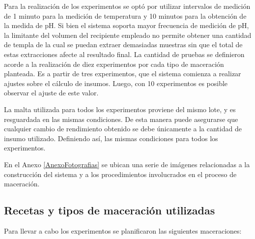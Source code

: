         \par Para la realización de los experimentos se optó por utilizar intervalos de medición de 1 minuto para la medición de temperatura y 10 minutos para la obtención de la medida de pH. Si bien el sistema soporta mayor frecuencia de medición de pH, la limitante del volumen del recipiente empleado no permite obtener una cantidad de templa de la cual se puedan extraer demasiadas muestras sin que el total de estas extracciones afecte al resultado final. La cantidad de pruebas se definieron acorde a la realización de diez experimentos por cada tipo de maceración planteada. Es a partir de tres experimentos, que el sistema comienza a realizar ajustes sobre el cálculo de insumos. Luego, con 10 experimentos es posible observar el ajuste de este valor.
        
        \par La malta utilizada para todos los experimentos proviene del mismo lote, y es resguardada en las mismas condiciones. De esta manera puede asegurarse que cualquier cambio de rendimiento obtenido se debe únicamente a la cantidad de insumo utilizado. Definiendo así, las mismas condiciones para todos los experimentos.
        
        En el Anexo \ref{AnexoFotografias} se ubican una serie de imágenes relacionadas a la construcción del sistema y a los procedimientos involucrados en el proceso de maceración.
    \subsection{Recetas y tipos de maceración utilizadas}
        \par Para llevar a cabo los experimentos se planificaron las siguientes maceraciones:
